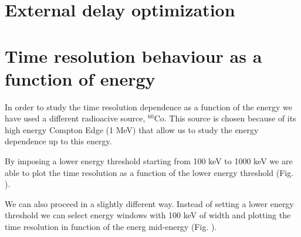 \documentclass[a4paper,11pt]{article}
\begin{document}
\section*{External delay optimization}

\section*{Time resolution behaviour as a function of energy}
In order to study the time resolution dependence as a function of the energy we have used a different radioacive source, $^{60}$Co. This source is chosen because of its high energy Compton Edge (1 MeV) that allow us to study the energy dependence up to this energy. 

\noindent By imposing a lower energy threshold starting from 100 keV to 1000 keV we are able to plot the time resolution as a function of the lower energy threshold (Fig. ).

\noindent We can also proceed in a slightly different way. Instead of setting a lower energy threshold we can select energy windows with 100 keV of width and plotting the time resolution in function of the energ mid-energy (Fig. ).


\end{document}
